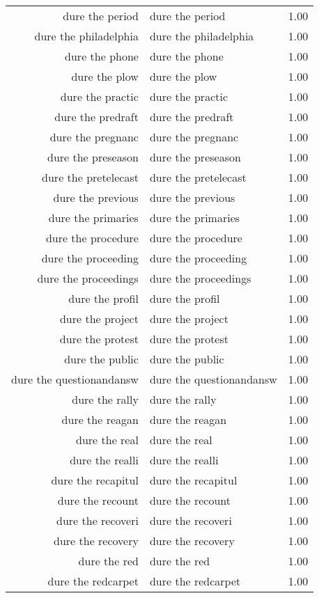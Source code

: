 \begin{table}[ht]
\begin{tabular}{rlr}
  dure the period & dure the period & 1.00 \\ 
  dure the philadelphia & dure the philadelphia & 1.00 \\ 
  dure the phone & dure the phone & 1.00 \\ 
  dure the plow & dure the plow & 1.00 \\ 
  dure the practic & dure the practic & 1.00 \\ 
  dure the predraft & dure the predraft & 1.00 \\ 
  dure the pregnanc & dure the pregnanc & 1.00 \\ 
  dure the preseason & dure the preseason & 1.00 \\ 
  dure the pretelecast & dure the pretelecast & 1.00 \\ 
  dure the previous & dure the previous & 1.00 \\ 
  dure the primaries & dure the primaries & 1.00 \\ 
  dure the procedure & dure the procedure & 1.00 \\ 
  dure the proceeding & dure the proceeding & 1.00 \\ 
  dure the proceedings & dure the proceedings & 1.00 \\ 
  dure the profil & dure the profil & 1.00 \\ 
  dure the project & dure the project & 1.00 \\ 
  dure the protest & dure the protest & 1.00 \\ 
  dure the public & dure the public & 1.00 \\ 
  dure the questionandansw & dure the questionandansw & 1.00 \\ 
  dure the rally & dure the rally & 1.00 \\ 
  dure the reagan & dure the reagan & 1.00 \\ 
  dure the real & dure the real & 1.00 \\ 
  dure the realli & dure the realli & 1.00 \\ 
  dure the recapitul & dure the recapitul & 1.00 \\ 
  dure the recount & dure the recount & 1.00 \\ 
  dure the recoveri & dure the recoveri & 1.00 \\ 
  dure the recovery & dure the recovery & 1.00 \\ 
  dure the red & dure the red & 1.00 \\ 
  dure the redcarpet & dure the redcarpet & 1.00 \\ 

\end{tabular}
\end{table}
